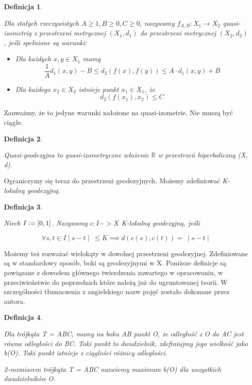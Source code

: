 \documentclass[licencjacka]{pracamgr}
\newcommand{\defeq}{\vcentcolon=}
\newtheorem{defi}{Definicja}[section]
\begin{document}
\begin{defi}\label{Quasi-isometries}

Dla stałych rzeczywistych  $A \geq 1, B \geq 0, C \geq 0$, nazywamy $f_{A, B} : X_1 \rightarrow X_2$ \emph{quasi-izometrią} z przestrzeni metrycznej $(X_{1}, d_{1})$ do przestrzeni metrycznej $(X_{2}, d_{2})$, jeśli spełnione są warunki:

\begin{itemize}

\item Dla każdych $x, y \in X_{1}$ mamy
\[ \frac{1}{A} d_{1}(x, y) - B \leq d_{2}(f(x), f(y)) \leq A \cdot d_{1}(x, y) + B \]
\item Dla każdego $x_{2} \in X_{2}$ istnieje punkt $x_{1} \in X_{1}$, że
\[ d_{2}(f(x_{1}), x_{2}) \leq C \]

\end{itemize}
\end{defi}

Zauważmy, że to jedyne warunki nałożone na quasi-izometrie. Nie muszą być ciągłe.

\begin{defi}\label{Quasi-geodesic}

\emph{Quasi-geodezyjna} to quasi-izometryczne włożenie $\mathbb{R}$ w przestrzeń hiperboliczną (X, d).

\end{defi}

Ograniczymy się teraz do przestrzeni geodezyjnych. Możemy zdefiniować \textit{K-lokalną geodezyjną}.

\begin{defi}\label{Local geodesic}

Niech $I \defeq [0, 1]$.
Nazywamy $c : I -> X$ K-lokalną geodezyjną, jeśli

\[ \forall{s, t \in I} \mid s - t \mid \  \leq K \implies d(c(s), c(t)) = \ \mid s - t \mid \]

\end{defi}

Możemy też rozważać wielokąty w dowolnej przestrzeni geodezyjnej. Zdefiniowane są w standardowy sposób, boki są geodezyjnymi w X. Poniższe definicje są powiązane z dowodem głównego twierdzenia zawartego w opracowaniu, w przeciwieństwie do poprzednich które należą już do ugruntowanej teorii. W szczególności tłumaczenia z angielskiego nazw pojęć zostało dokonane przez autora.

\begin{defi}\label{Bisize of traingle}

Dla trójkąta T = ABC, mamy na boku AB punkt O, że odległość z O do AC jest równa odległości do BC. Taki punkt to dwudzielnik, zdefiniujmy jego wielkość jako b(O). Taki punkt istnieje z ciągłości różnicy odległości.

2-rozmiarem trójkąta T = ABC nazwiemy maximum b(O) dla wszystkich dwudzielników O.

\end{defi}
\end{document}
